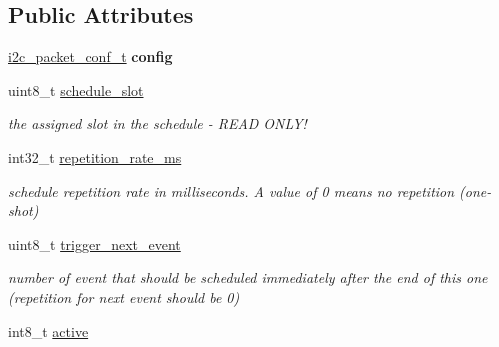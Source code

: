 \subsection*{Public Attributes}
\begin{DoxyCompactItemize}
\item 
\hypertarget{structi2c__schedule__event__t_ae2fda105110c62cd1188fe49135d05e9}{\hyperlink{structi2c__packet__conf__t}{i2c\+\_\+packet\+\_\+conf\+\_\+t} {\bfseries config}}\label{structi2c__schedule__event__t_ae2fda105110c62cd1188fe49135d05e9}

\item 
\hypertarget{structi2c__schedule__event__t_a1a0e267d46aea630009765b81172117b}{uint8\+\_\+t \hyperlink{structi2c__schedule__event__t_a1a0e267d46aea630009765b81172117b}{schedule\+\_\+slot}}\label{structi2c__schedule__event__t_a1a0e267d46aea630009765b81172117b}

\begin{DoxyCompactList}\small\item\em the assigned slot in the schedule -\/ R\+E\+A\+D O\+N\+L\+Y! \end{DoxyCompactList}\item 
\hypertarget{structi2c__schedule__event__t_a6f28234fee660f4ecbf7ff2ca7dfe807}{int32\+\_\+t \hyperlink{structi2c__schedule__event__t_a6f28234fee660f4ecbf7ff2ca7dfe807}{repetition\+\_\+rate\+\_\+ms}}\label{structi2c__schedule__event__t_a6f28234fee660f4ecbf7ff2ca7dfe807}

\begin{DoxyCompactList}\small\item\em schedule repetition rate in milliseconds. A value of 0 means no repetition (one-\/shot) \end{DoxyCompactList}\item 
\hypertarget{structi2c__schedule__event__t_a7b0459a1ff245db1239ad8b8ca4cde77}{uint8\+\_\+t \hyperlink{structi2c__schedule__event__t_a7b0459a1ff245db1239ad8b8ca4cde77}{trigger\+\_\+next\+\_\+event}}\label{structi2c__schedule__event__t_a7b0459a1ff245db1239ad8b8ca4cde77}

\begin{DoxyCompactList}\small\item\em number of event that should be scheduled immediately after the end of this one (repetition for next event should be 0) \end{DoxyCompactList}\item 
\hypertarget{structi2c__schedule__event__t_ab6d5b8b671e8ca4e8cae57bda8992681}{int8\+\_\+t \hyperlink{structi2c__schedule__event__t_ab6d5b8b671e8ca4e8cae57bda8992681}{active}}\label{structi2c__schedule__event__t_ab6d5b8b671e8ca4e8cae57bda8992681}


\end{DoxyCompactItemize}
